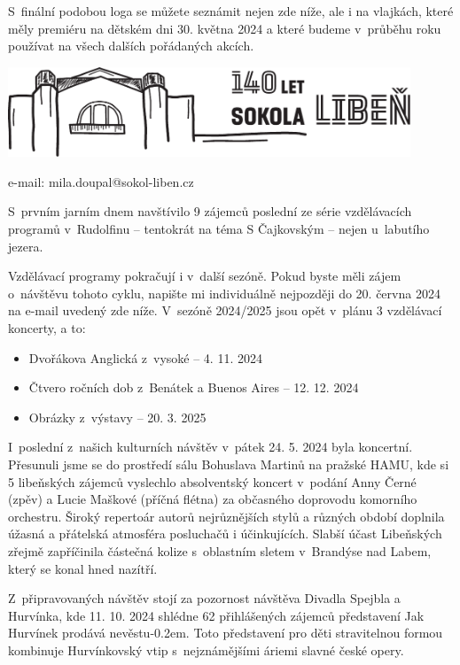 \documentclass[11pt]{article}
\begin{document}
S~finální podobou loga se můžete seznámit nejen zde níže, ale i na vlajkách, které měly premiéru na dětském dni 30. května 2024 a které budeme v~průběhu roku používat na všech dalších pořádaných akcích.

\vspace*{12pt}
\begin{center}
  \includegraphics*[width=0.9\textwidth]{logo-140-horiz.pdf}
\end{center}

\signature{Miloslav Doupal}{e-mail: mila.doupal@sokol-liben.cz}

\clearpage

S~prvním jarním dnem navštívilo 9 zájemců poslední ze série vzdělávacích programů v~Rudolfinu – tentokrát na téma \luv{}S Čajkovským – nejen u~labutího jezera\ruv{}.

Vzdělávací programy pokračují i v~další sezóně. Pokud byste měli zájem o~návštěvu tohoto cyklu, napište mi individuálně nejpozději do 20. června 2024 na e-mail uvedený zde níže. V~sezóně 2024/2025 jsou opět v~plánu 3 vzdělávací koncerty, a to:

\renewcommand{\arraystretch}{1}
\begin{itemize}
  \setlength\itemsep{-3pt}
  \item Dvořákova Anglická z~vysoké – 4. 11. 2024
  \item Čtvero ročních dob z~Benátek a Buenos Aires – 12. 12. 2024
  \item Obrázky z~výstavy – 20. 3. 2025
\end{itemize}

I~poslední z~našich kulturních návštěv v~pátek 24. 5. 2024 byla koncertní. Přesunuli jsme se do prostředí sálu Bohuslava Martinů na pražské HAMU, kde si 5 libeňských zájemců vyslechlo absolventský koncert v~podání Anny Černé (zpěv) a Lucie Maškové (příčná flétna) za občasného doprovodu komorního orchestru. Široký repertoár autorů nejrůznějších stylů a různých období doplnila úžasná a přátelská atmosféra posluchačů i účinkujících. Slabší účast Libeňských zřejmě zapříčinila částečná kolize s~oblastním sletem v~Brandýse nad Labem, který se konal hned nazítří.

Z~připravovaných návštěv stojí za pozornost návštěva Divadla Spejbla a Hurvínka, kde 11. 10. 2024 shlédne 62 přihlášených zájemců představení \luv{}Jak Hurvínek prodává nevěstu\ruv{}\kern-0.2em. Toto představení pro děti stravitelnou formou kombinuje Hurvínkovský vtip s~nejznámějšími áriemi slavné české opery.
\end{document}
